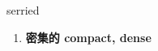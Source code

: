 
\begin{frame}
{\huge serried}
\begin{center}
\begin{enumerate}\Large
  \item \textbf{密集的 compact, dense}
\end{enumerate}
\end{center}
\end{frame}
